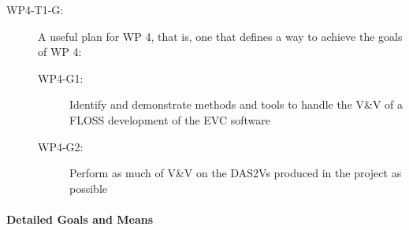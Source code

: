 \documentclass{template/openetcs_report}
\begin{document}
\begin{description}
\item[WP4-T1-G:] A useful plan for WP 4, that is, one that defines a
way to achieve the goals of WP 4:
  \begin{description}
  \item[WP4-G1:] Identify and demonstrate methods and tools to handle
    the V\&V of a FLOSS development of the EVC software
  \item[WP4-G2:] Perform as much of V\&V on the DAS2Vs produced in the
    project as possible
  \end{description}
\end{description}

\paragraph{Detailed Goals and Means}
\label{sec:detailed-goals-means}
\end{document}
